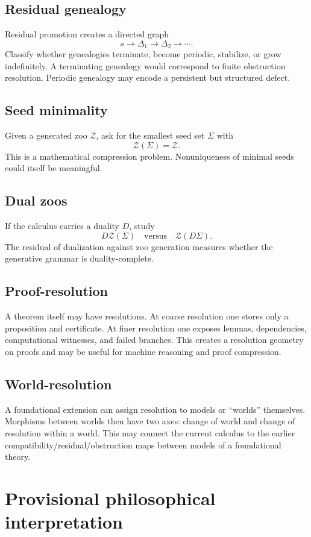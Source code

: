 \documentclass[11pt]{article}
\theoremstyle{definition}
\theoremstyle{remark}
\newcommand{\Zoo}{\mathcal Z}
\newcommand{\Seeds}{\Sigma}
\begin{document}
\subsection{Residual genealogy}
Residual promotion creates a directed graph
\[
s\to\Delta_1\to\Delta_2\to\cdots.
\]
Classify whether genealogies terminate, become periodic, stabilize, or grow indefinitely. A terminating genealogy would correspond to finite obstruction resolution. Periodic genealogy may encode a persistent but structured defect.

\subsection{Seed minimality}
Given a generated zoo $\Zoo$, ask for the smallest seed set $\Seeds$ with
\[
\Zoo(\Seeds)=\Zoo.
\]
This is a mathematical compression problem. Nonuniqueness of minimal seeds could itself be meaningful.

\subsection{Dual zoos}
If the calculus carries a duality $D$, study
\[
D\Zoo(\Seeds)
\quad\text{versus}\quad
\Zoo(D\Seeds).
\]
The residual of dualization against zoo generation measures whether the generative grammar is duality-complete.

\subsection{Proof-resolution}
A theorem itself may have resolutions. At coarse resolution one stores only a proposition and certificate. At finer resolution one exposes lemmas, dependencies, computational witnesses, and failed branches. This creates a resolution geometry on proofs and may be useful for machine reasoning and proof compression.

\subsection{World-resolution}
A foundational extension can assign resolution to models or ``worlds'' themselves. Morphisms between worlds then have two axes: change of world and change of resolution within a world. This may connect the current calculus to the earlier compatibility/residual/obstruction maps between models of a foundational theory.

\section{Provisional philosophical interpretation}
\end{document}
